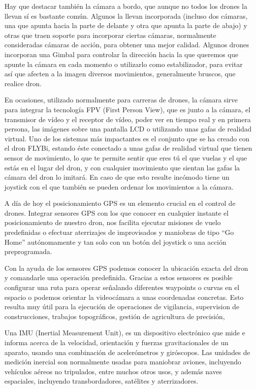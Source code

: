 Hay que destacar también la cámara a bordo, que aunque no todos los drones la llevan sí es bastante común. Algunos la llevan incorporada (incluso dos cámaras, una que apunta hacia la parte de delante y otra que apunta la parte de abajo) y otras que traen soporte para incorporar ciertas cámaras, normalmente consideradas cámaras de acción, para obtener una mejor calidad. Algunos drones incorporan una Gimbal para controlar la dirección hacia la que queremos que apunte la cámara en cada momento o utilizarlo como estabilizador, para evitar así que afecten a la imagen diversos movimientos, generalmente bruscos, que realice dron. 

En ocasiones, utilizado normalmente para carreras de drones, la cámara sirve para integrar la tecnología FPV (First Person View), que es junto a la cámara, el transmisor de vídeo y el receptor de vídeo, poder ver en tiempo real y en primera persona, las imágenes sobre una pantalla LCD o utilizando unas gafas de realidad virtual. Uno de los sistemas más impactantes es el conjunto que se ha creado con el dron FLYBi, estando éste conectado a unas gafas de realidad virtual que tienen sensor de movimiento, lo que te permite sentir que eres tú el que vuelas y el que estás en el lugar del dron, y con cualquier movimiento que sientan las gafas la cámara del dron lo imitará. En caso de que esto resulte incómodo tiene un joystick con el que también se pueden ordenar los movimientos a la cámara.

A día de hoy el posicionamiento GPS es un elemento crucial en el control de drones. Integrar sensores GPS con los que conocer en cualquier instante el posicionamiento de nuestro dron, nos facilita ejecutar misiones de vuelo predefinidas o efectuar aterrizajes de improvisados y maniobras de tipo “Go Home” autónomamente y tan solo con un botón del joystick o una acción preprogramada.

Con la ayuda de los sensores GPS podemos conocer la ubicación exacta del dron y comandarle una operación predefinida. Gracias a estos sensores es posible configurar una ruta para operar señalando diferentes waypoints o curvas en el espacio o podemos orientar la videocámara a unas coordenadas concretas. Esto resulta muy útil para la ejecución de operaciones de vigilancia, supervision de construcciones, trabajos topográficos, gestión de agricultura de precisión,

Una IMU (Inertial Measurement Unit), es un dispositivo electrónico que mide e informa acerca de la velocidad, orientación y fuerzas gravitacionales de un aparato, usando una combinación de acelerómetros y giróscopos. Las unidades de medición inercial son normalmente usadas para maniobrar aviones, incluyendo vehículos aéreos no tripulados, entre muchos otros usos, y además naves espaciales, incluyendo transbordadores, satélites y aterrizadores.

